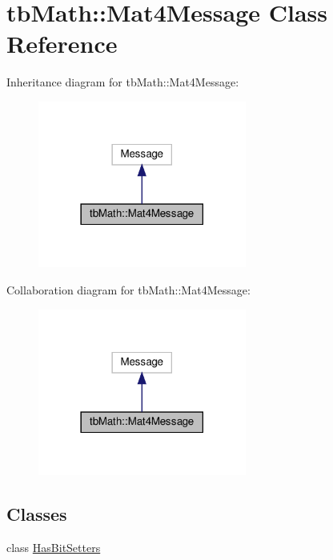 \hypertarget{classtbMath_1_1Mat4Message}{}\section{tb\+Math\+:\+:Mat4\+Message Class Reference}
\label{classtbMath_1_1Mat4Message}


Inheritance diagram for tb\+Math\+:\+:Mat4\+Message\+:
\nopagebreak
\begin{figure}[H]
\begin{center}
\leavevmode
\includegraphics[width=194pt]{classtbMath_1_1Mat4Message__inherit__graph}
\end{center}
\end{figure}


Collaboration diagram for tb\+Math\+:\+:Mat4\+Message\+:
\nopagebreak
\begin{figure}[H]
\begin{center}
\leavevmode
\includegraphics[width=194pt]{classtbMath_1_1Mat4Message__coll__graph}
\end{center}
\end{figure}
\subsection*{Classes}
\begin{DoxyCompactItemize}
\item 
class \hyperlink{classtbMath_1_1Mat4Message_1_1HasBitSetters}{Has\+Bit\+Setters}
\end{DoxyCompactItemize}
